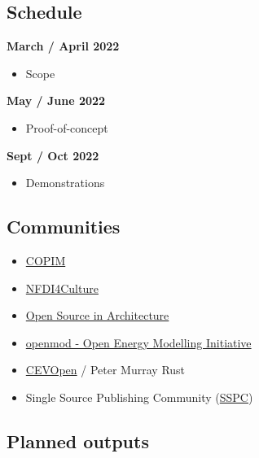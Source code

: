 \documentclass{article}
\begin{document}
\subsection{Schedule}\label{H8614052}



\textbf{March / April 2022}

\begin{itemize}
\item Scope


\end{itemize}

\textbf{May / June 2022}

\begin{itemize}
\item Proof-of-concept


\end{itemize}

\textbf{Sept / Oct 2022}

\begin{itemize}
\item Demonstrations


\end{itemize}

\subsection{Communities}\label{H637961}


\begin{itemize}
\item \href{https://www.copim.ac.uk/}{COPIM}


\item \href{https://nfdi4culture.de/index.html}{NFDI4Culture}


\item \href{https://osarch.org/}{Open Source in Architecture}


\item \href{https://openmod-initiative.org/}{openmod - Open Energy Modelling Initiative}


\item \href{https://github.com/petermr/CEVOpen}{CEVOpen} / Peter Murray Rust


\item Single Source Publishing Community (\href{https://singlesource.pub/}{SSPC})


\end{itemize}

\subsection{Planned outputs}\label{H6024753}
\end{document}
